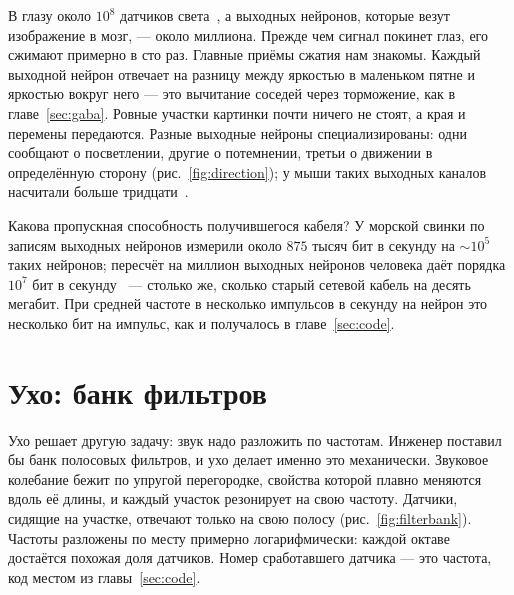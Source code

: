 В глазу около $10^8$ датчиков света~\cite{Curcio1990}, а выходных нейронов, которые везут изображение в мозг, --- около миллиона. Прежде чем сигнал покинет глаз, его сжимают примерно в сто раз. Главные приёмы сжатия нам знакомы. Каждый выходной нейрон отвечает на разницу между яркостью в маленьком пятне и яркостью вокруг него --- это вычитание соседей через торможение, как в главе~\ref{sec:gaba}. Ровные участки картинки почти ничего не стоят, а края и перемены передаются. Разные выходные нейроны специализированы: одни сообщают о посветлении, другие о потемнении, третьи о движении в определённую сторону (рис.~\ref{fig:direction}); у мыши таких выходных каналов насчитали больше тридцати~\cite{Baden2016}.

Какова пропускная способность получившегося кабеля? У морской свинки по записям выходных нейронов измерили около $875$ тысяч бит в секунду на $\sim10^5$ таких нейронов; пересчёт на миллион выходных нейронов человека даёт порядка $10^7$ бит в секунду~\cite{Koch2006} --- столько же, сколько старый сетевой кабель на десять мегабит. При средней частоте в несколько импульсов в секунду на нейрон это несколько бит на импульс, как и получалось в главе~\ref{sec:code}.

\section{Ухо: банк фильтров}

Ухо решает другую задачу: звук надо разложить по частотам. Инженер поставил бы банк полосовых фильтров, и ухо делает именно это механически. Звуковое колебание бежит по упругой перегородке, свойства которой плавно меняются вдоль её длины, и каждый участок резонирует на свою частоту. Датчики, сидящие на участке, отвечают только на свою полосу (рис.~\ref{fig:filterbank}). Частоты разложены по месту примерно логарифмически: каждой октаве достаётся похожая доля датчиков. Номер сработавшего датчика --- это частота, код местом из главы~\ref{sec:code}.

